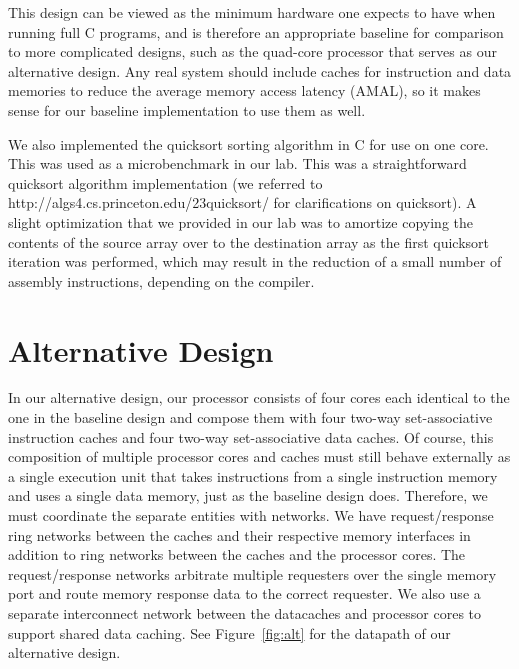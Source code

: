 \documentclass[10pt]{article}
\begin{document}
This design can be viewed as the minimum hardware one expects to have when running full C programs, and is therefore
an appropriate baseline for comparison to more complicated designs, such as the quad-core processor that serves as
our alternative design. Any real system should include caches for instruction and data memories to reduce the average memory
access latency (AMAL), so it makes sense for our baseline implementation to use them as well. 

We also implemented the quicksort sorting algorithm in C for use on one core. This was used as a microbenchmark in our lab. This was a straightforward quicksort algorithm implementation (we referred to http://algs4.cs.princeton.edu/23quicksort/ for clarifications on quicksort). A slight optimization that we provided in our lab was to amortize copying the contents of the source array over to the destination array as the first quicksort iteration was performed, which may result in the reduction of a small number of assembly instructions, depending on the compiler.


\section{Alternative Design}

In our alternative design, our processor consists of four cores each identical to the one in the baseline design and compose them with four two-way set-associative instruction caches and four two-way set-associative data caches. Of course, this composition of multiple processor cores and caches must still behave externally as a single execution unit that takes instructions from a single instruction memory and uses a single data memory, just as the baseline design does. Therefore, we must coordinate the separate entities with networks. We have request/response ring networks between the caches and their respective memory interfaces in addition to ring networks between the caches and the processor cores. The request/response networks arbitrate multiple requesters over the single memory port and route memory response data to the correct requester. We also use a separate interconnect network between the datacaches and processor cores to support shared data caching. See Figure~\ref{fig:alt} for the datapath of our alternative design.
\end{document}
